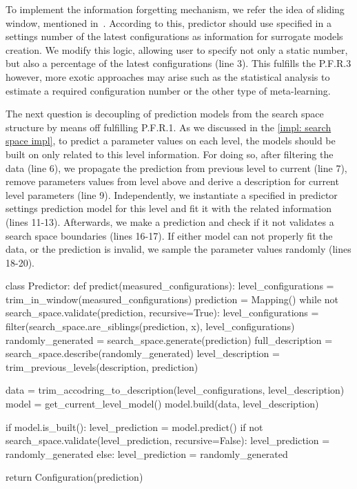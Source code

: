To implement the information forgetting mechanism, we refer the idea of sliding window, mentioned in~\cite{ferreira2017multi}. According to this, predictor should use specified in a settings number of the latest configurations as information for surrogate models creation. We modify this logic, allowing user to specify not only a static number, but also a percentage of the latest configurations (line 3). This fulfills the P.F.R.3 however, more exotic approaches may arise such as the statistical analysis to estimate a required configuration number or the other type of meta-learning.

The next question is decoupling of prediction models from the search space structure by means off fulfilling P.F.R.1. As we discussed in the \cref{impl: search space impl}, to predict a parameter values on each level, the models should be built on only related to this level information. For doing so, after filtering the data (line 6), we propagate the prediction from previous level to current (line 7), remove parameters values from level above and derive a description for current level parameters (line 9). Independently, we instantiate a specified in predictor settings prediction model for this level and fit it with the related information (lines 11-13). Afterwards, we make a prediction and check if it not validates a search space boundaries (lines 16-17). If either model can not properly fit the data, or the prediction is invalid, we sample the parameter values randomly (lines 18-20).

\begin{code}[language=Python, caption=P.F.R.1 + P.F.R.3 implementation pseudo-code., label=impl: P.F.R.1 + P.F.R.3 implementation pseudocode]
class Predictor:
	def predict(measured_configurations):
		level_configurations = trim_in_window(measured_configurations)
		prediction = Mapping()
		while not search_space.validate(prediction, recursive=True):
			level_configurations = filter(search_space.are_siblings(prediction, x), level_configurations)
			randomly_generated = search_space.generate(prediction)
			full_description = search_space.describe(randomly_generated)
			level_description = trim_previous_levels(description, prediction)
			
			data = trim_accodring_to_description(level_configurations, level_description)
			model = get_current_level_model()
			model.build(data, level_description)
			
			if model.is_built():
				level_prediction = model.predict()
				if not search_space.validate(level_prediction, recursive=False):
					level_prediction = randomly_generated
			else:
				level_prediction = randomly_generated
		
		return Configuration(prediction)
\end{code}

